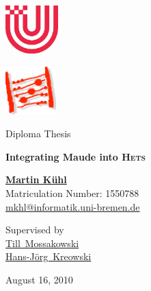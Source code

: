 \documentclass[11pt]{article}
\date{August 16, 2010}
\newcommand{\Hets}{\textsc{Hets}}
\begin{document}
\begin{titlepage}
  \begin{minipage}{0.5\textwidth}
    \begin{flushleft}
      \begin{minipage}{6em}
        \includegraphics[height=5em]{logo-uni.png}
      \end{minipage}
      \begin{minipage}{11em}
      \end{minipage}
    \end{flushleft}
  \end{minipage}
  \begin{minipage}{0.5\textwidth}
    \begin{flushright}
      \begin{minipage}{6em}
        \includegraphics[height=5em]{logo-fb3.png}
      \end{minipage}
      \begin{minipage}{11em}
      \end{minipage}
    \end{flushright}
  \end{minipage}
  \vspace{5cm}
  \begin{center}
    
    {\Large{}Diploma Thesis}
    
    \textbf{\Huge{}Integrating Maude into \Hets{}}
    
    \vspace{2cm}
    \textbf{\Large{}\href{http://purl.org/net/mkhl}{Martin Kühl}}\\
    {\large{}
     Matriculation Number: 1550788\\
     \href{mailto:mkhl@informatik.uni-bremen.de}%
          {mkhl@informatik.uni-bremen.de}}
    
    \vspace{2cm}
    {\Large{}
     Supervised by\\
     {\href{http://www.informatik.uni-bremen.de/~till/}%
           {Till~Mossakowski}}\\
     {\href{http://www.informatik.uni-bremen.de/theorie/kreo/}%
           {Hans-Jörg~Kreowski}}\\
    }
    
    \vfill
    {\large{}August 16, 2010}
  \end{center}
\end{titlepage}
\end{document}
